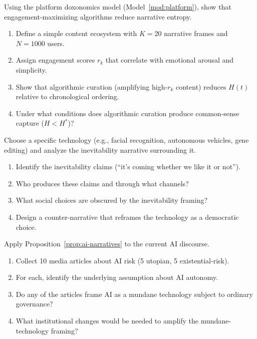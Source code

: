 \begin{exercise}
Using the platform doxonomics model (Model~\ref{mod:platform}), show that engagement-maximizing algorithms reduce narrative entropy.
\begin{enumerate}[nosep]
  \item Define a simple content ecosystem with $K = 20$ narrative frames and $N = 1000$ users.
  \item Assign engagement scores $r_k$ that correlate with emotional arousal and simplicity.
  \item Show that algorithmic curation (amplifying high-$r_k$ content) reduces $H(t)$ relative to chronological ordering.
  \item Under what conditions does algorithmic curation produce common-sense capture ($H < H^*$)?
\end{enumerate}
\end{exercise}

\begin{exercise}
Choose a specific technology (e.g., facial recognition, autonomous vehicles, gene editing) and analyze the inevitability narrative surrounding it.
\begin{enumerate}[nosep]
  \item Identify the inevitability claims (``it's coming whether we like it or not'').
  \item Who produces these claims and through what channels?
  \item What social choices are obscured by the inevitability framing?
  \item Design a counter-narrative that reframes the technology as a democratic choice.
\end{enumerate}
\end{exercise}

\begin{exercise}
Apply Proposition~\ref{prop:ai-narratives} to the current AI discourse.
\begin{enumerate}[nosep]
  \item Collect 10 media articles about AI risk (5 utopian, 5 existential-risk).
  \item For each, identify the underlying assumption about AI autonomy.
  \item Do any of the articles frame AI as a mundane technology subject to ordinary governance?
  \item What institutional changes would be needed to amplify the mundane-technology framing?
\end{enumerate}
\end{exercise}

